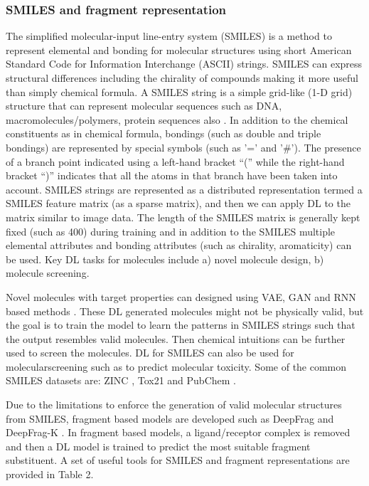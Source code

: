 \documentclass[pdflatex,sn-mathphys]{sn-jnl}%
\theoremstyle{thmstyleone}%
\theoremstyle{thmstyletwo}%
\theoremstyle{thmstylethree}%
\begin{document}

\subsubsection{SMILES and fragment representation}

The simplified molecular-input line-entry system (SMILES) is a method to represent elemental and bonding for molecular structures using short American Standard Code for Information Interchange (ASCII) strings. SMILES can express structural differences including the chirality of compounds making it more useful than simply chemical formula. A SMILES string is a simple grid-like (1-D grid) structure that can represent molecular sequences such as DNA, macromolecules/polymers, protein sequences also \cite{lin2019bigsmiles,tyagi2015cancerppd}. In addition to the chemical constituents as in chemical formula, bondings (such as double and triple bondings) are represented by special symbols (such as '=' and '\#'). The presence of a branch point indicated using a left-hand bracket “(” while the right-hand bracket “)” indicates that all the atoms in that branch have been taken into account. SMILES strings are represented as a distributed representation termed a SMILES feature matrix (as a sparse matrix), and then we can apply DL to the matrix similar to image data. The length of the SMILES matrix is generally kept fixed (such as 400) during training and in addition to the SMILES multiple elemental attributes and bonding attributes (such as chirality, aromaticity) can be used. Key DL tasks for molecules include a) novel molecule design, b) molecule screening.

Novel molecules with target properties can designed using VAE, GAN and RNN based methods \cite{krenn2020self,lim2018molecular,krasnov2021transformer}. These DL generated molecules might not be physically valid, but the goal is to train the model to learn the patterns in SMILES strings such that the output resembles valid molecules. Then chemical intuitions can be further used to screen the molecules. DL for SMILES can also be used for molecularscreening such as to predict molecular toxicity. Some of the common SMILES datasets are: ZINC \cite{irwin2012zinc}, Tox21 \cite{dix2007toxcast} and PubChem \cite{kim2019pubchem}.


Due to the limitations to enforce the generation of valid molecular structures from SMILES, fragment based models are developed such as DeepFrag and DeepFrag-K \cite{hirohara2018convolutional,gomez2018automatic}. In fragment based models, a ligand/receptor complex is removed and then a DL model is trained to predict the most suitable fragment substituent. A set of useful tools for SMILES and fragment representations are provided in Table 2.
\end{document}
